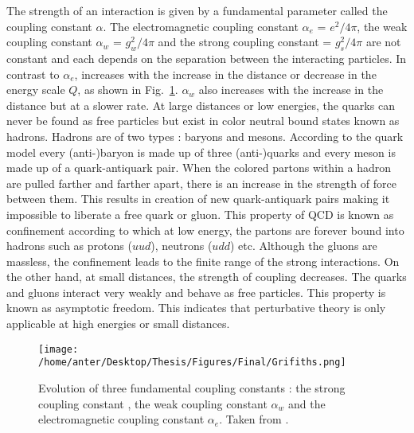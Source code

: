 The strength of an interaction is given by a fundamental parameter called the coupling constant $\alpha$. The electromagnetic coupling constant $\alpha_e$ = $e^2/4\pi$, the weak coupling constant $\alpha_w$ = $g^2_w/4\pi$ and the strong coupling constant \alpsq = $g^2_s/4\pi$ are not constant and each depends on the separation between the interacting particles. In contrast to $\alpha_e$, \alpsq increases with the increase in the distance or decrease in the energy scale $Q$, as shown in Fig.~\ref{fig:Grifiths}. $\alpha_w$ also increases with the increase in the distance but at a slower rate. At large distances or low energies, the quarks can never be found as free particles but exist in color neutral bound states known as hadrons. Hadrons are of two types : baryons and mesons. According to the quark model \cite{Griffiths:111880} every (anti-)baryon is made up of three (anti-)quarks and every meson is made up of a quark-antiquark pair. When the colored partons within a hadron are pulled farther and farther apart, there is an increase in the strength of force between them. This results in creation of new quark-antiquark pairs making it impossible to liberate a free quark or gluon. This property of QCD is known as confinement according to which at low energy, the partons are forever bound into hadrons such as protons ($uud$), neutrons ($udd$) etc. Although the gluons are massless, the confinement leads to the finite range of the strong interactions. On the other hand, at small distances, the strength of coupling decreases. The quarks and gluons interact very weakly and behave as free particles. This property is known as asymptotic freedom. This indicates that perturbative theory is only applicable at high energies or small distances.

\begin{figure}[!h]
\begin{center}
\texttt{[image: /home/anter/Desktop/Thesis/Figures/Final/Grifiths.png]}\\
\vspace*{4mm}
\caption[Evolution of three fundamental coupling constants : the strong coupling constant \alps, the weak coupling constant $\alpha_w$ and the electromagnetic coupling constant $\alpha_e$.]{Evolution of three fundamental coupling constants : the strong coupling constant \alps, the weak coupling constant $\alpha_w$ and the electromagnetic coupling constant $\alpha_e$. Taken from \cite{Griffiths:111880}.}
\label{fig:Grifiths}
\end{center}
\end{figure}

